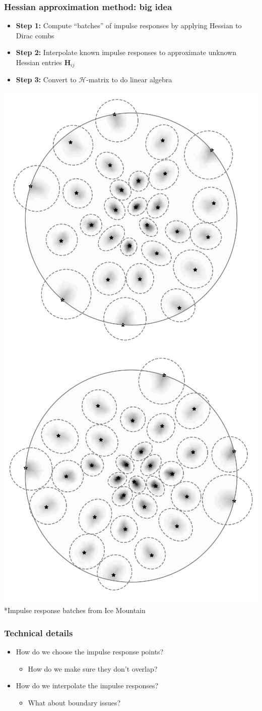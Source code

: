 \documentclass[10pt,final,xcolor=dvipsnames]{beamer}
\begin{document}
\begin{frame}
  \frametitle{Hessian approximation method: big idea}
      \begin{itemize}
      \item {\bf Step 1:} Compute ``batches'' of impulse responses by applying Hessian to Dirac combs
      \item {\bf Step 2:} Interpolate known impulse responses to approximate unknown Hessian entries $\mathbf{H}_{ij}$
      \item {\bf Step 3:} Convert to $\mathcal{H}$-matrix to do linear algebra
      \end{itemize}
  	\includegraphics[width=0.45\columnwidth]{impulse_batch1.png}  \includegraphics[width=0.45\columnwidth]{impulse_batch2.png}
  *Impulse response batches from Ice Mountain
\end{frame}
\begin{frame}
	\frametitle{Technical details}
	{\Large
		\begin{itemize}
			\setlength\itemsep{2em}
			\item How do we choose the impulse response points?
			\begin{itemize}
				\item {\large How do we make sure they don't overlap?}
			\end{itemize}
			\item How do we interpolate the impulse responses? 
			\begin{itemize}
				\item {\large What about boundary issues?}
			\end{itemize}
		\end{itemize}
	}
\end{frame}
\end{document}
